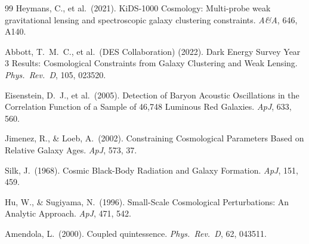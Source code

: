 \documentclass[12pt,a4paper]{article}
\begin{document}
\begin{thebibliography}{99}
Heymans, C., et al.\ (2021).
KiDS-1000 Cosmology: Multi-probe weak gravitational lensing and spectroscopic galaxy clustering constraints.
\textit{A\&A}, 646, A140.

Abbott, T.~M.~C., et al.\ (DES Collaboration) (2022).
Dark Energy Survey Year 3 Results: Cosmological Constraints from Galaxy Clustering and Weak Lensing.
\textit{Phys.~Rev.~D}, 105, 023520.

Eisenstein, D.~J., et al.\ (2005).
Detection of Baryon Acoustic Oscillations in the Correlation Function of a Sample of 46,748 Luminous Red Galaxies.
\textit{ApJ}, 633, 560.

Jimenez, R., \& Loeb, A.\ (2002).
Constraining Cosmological Parameters Based on Relative Galaxy Ages.
\textit{ApJ}, 573, 37.

Silk, J.\ (1968).
Cosmic Black-Body Radiation and Galaxy Formation.
\textit{ApJ}, 151, 459.

Hu, W., \& Sugiyama, N.\ (1996).
Small-Scale Cosmological Perturbations: An Analytic Approach.
\textit{ApJ}, 471, 542.

Amendola, L.\ (2000).
Coupled quintessence.
\textit{Phys.~Rev.~D}, 62, 043511.

\end{thebibliography}
\end{document}
